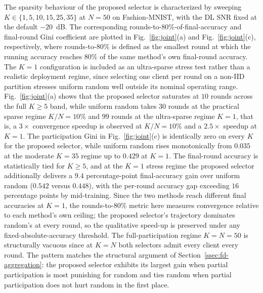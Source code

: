 \documentclass[journal]{IEEEtran}
\newcommand{\new}[1]{#1}
\newcommand{\revIVE}[1]{#1}
\begin{document}
\new{The sparsity behaviour of the proposed selector is characterized by sweeping $K \in \{1, 5, 10, 15, 25, 35\}$ at $N = 50$ on Fashion-MNIST, with the DL SNR fixed at the default $-20$~dB. The corresponding rounds-to-$80\%$-of-final-accuracy and final-round Gini coefficient are plotted in Fig.~\ref{fig:joint}(a) and Fig.~\ref{fig:joint}(c), respectively, where rounds-to-$80\%$ is defined as the smallest round at which the running accuracy reaches $80\%$ of the same method's own final-round accuracy. The $K = 1$ configuration is included as an ultra-sparse stress test rather than a realistic deployment regime, since selecting one client per round on a non-IID partition stresses uniform random well outside its nominal operating range. \revIVE{Fig.~\ref{fig:joint}(a) shows that the proposed selector saturates at $10$ rounds across the full $K \ge 5$ band}, while uniform random takes $30$ rounds at the practical sparse regime $K/N = 10\%$ and $99$ rounds at the ultra-sparse regime $K = 1$, that is, a $3\times$ convergence speedup is observed at $K/N=10\%$ and a $2.5\times$ speedup at $K = 1$. The participation Gini in Fig.~\ref{fig:joint}(c) is identically zero on every $K$ for the proposed selector, while uniform random rises monotonically from $0.035$ at the moderate $K = 35$ regime up to $0.429$ at $K = 1$. The final-round accuracy is statistically tied for $K \ge 5$, and at the $K = 1$ stress regime the proposed selector additionally delivers a $9.4$ percentage-point final-accuracy gain over uniform random ($0.542$ versus $0.448$), with the per-round accuracy gap exceeding $16$ percentage points by mid-training. \revIVE{Since the two methods reach different final accuracies at $K = 1$, the rounds-to-$80\%$ metric here measures convergence relative to each method's own ceiling; the proposed selector's trajectory dominates random's at every round, so the qualitative speed-up is preserved under any fixed-absolute-accuracy threshold.} The full-participation regime $K = N = 50$ is structurally vacuous since at $K = N$ both selectors admit every client every round. \revIVE{The pattern matches the structural argument of Section~\ref{ssec:fd-aggregation}}: the proposed selector exhibits its largest gain when partial participation is most punishing for random and ties random when partial participation does not hurt random in the first place.}
\vspace{-1em}
\end{document}
